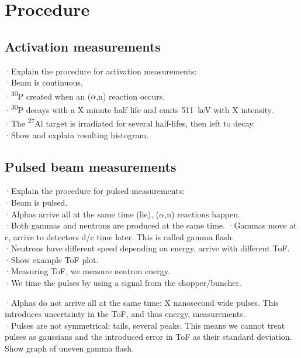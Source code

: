 \documentclass[a4paper,12pt]{report}
\newcommand{\an}{($\alpha$,n) }
\newcommand{\Aliso}{\textsuperscript{27}Al }
\newcommand{\Piso}{\textsuperscript{30}P }
\begin{document}
\section{Procedure}
\subsection{Activation measurements}
·Explain the procedure for activation measurements:\\
·Beam is continuous.\\
·\Piso created when an \an reaction occurs.\\
·\Piso decays with a X minute half life and emits \qty{511}{\keV} with X intensity.\\
·The \Aliso target is irradiated for several half-lifes, then left to decay.\\
·Show and explain resulting histogram.\\

\subsection{Pulsed beam measurements}
·Explain the procedure for pulsed measurements:\\
·Beam is pulsed.\\
·Alphas arrive all at the same time (lie), \an reactions happen.\\
·Both gammas and neutrons are produced at the same time.	%
·Gammas move at c, arrive to detectors d/c time later. This is called gamma flash.\\
·Neutrons have different speed depending on energy, arrive with different ToF.\\
·Show example ToF plot.\\
·Measuring ToF, we measure neutron energy.\\
·We time the pulses by using a signal from the chopper/buncher.	%

·Alphas do not arrive all at the same time: X nanosecond wide pulses. This introduces uncertainty in the ToF, and thus energy, measurements.\\
·Pulses are not symmetrical: tails, several peaks. This means we cannot treat pulses as gaussians and the introduced error in ToF as their standard deviation. Show graph of uneven gamma flash.\\
\end{document}
